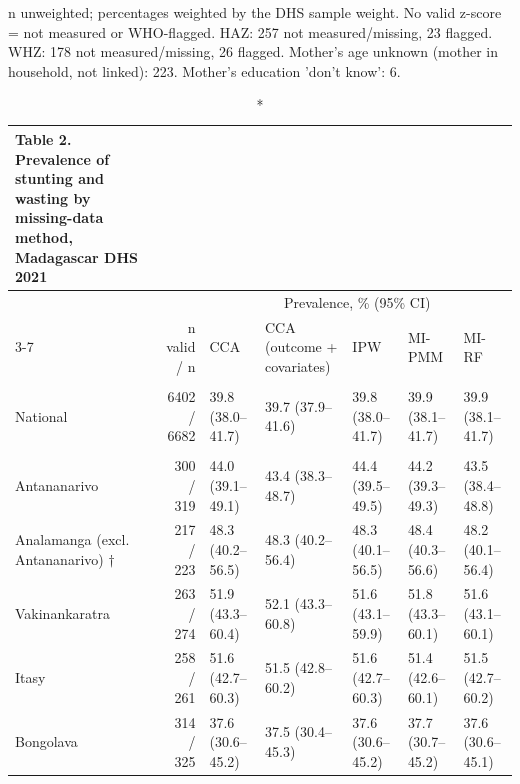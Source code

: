 \documentclass[11pt,a4paper]{article}
\begin{document}
\begin{minipage}{\linewidth}
\vspace{.05em}
n unweighted; percentages weighted by the DHS sample weight. No valid z-score = not measured or WHO-flagged. HAZ: 257 not measured/missing, 23 flagged. WHZ: 178 not measured/missing, 26 flagged. Mother's age unknown (mother in household, not linked): 223. Mother's education 'don't know': 6.\\
\end{minipage}
\endgroup

\clearpage

\begin{landscape}
\begingroup
\fontsize{8.0pt}{10.0pt}\selectfont
\setlength{\LTpost}{0mm}
\begin{longtable}{l|rlllll}
\caption*{
{\fontsize{20}{25}\selectfont  Table 2. Prevalence of stunting and wasting by missing-data method, Madagascar DHS 2021\fontsize{8}{10}\selectfont }
} \\ 
\toprule
 &  & \multicolumn{5}{c}{{Prevalence, \% (95\% CI)}} \\ 
\cmidrule(lr){3-7}
 & n valid / n & CCA & CCA (outcome + covariates) & IPW & MI-PMM & MI-RF \\ 
\midrule\endhead\addlinespace[2.5pt]
\multicolumn{7}{l}{Stunting — National} \\[2.5pt] 
\midrule\addlinespace[2.5pt]
National & 6402 / 6682 & 39.8 (38.0–41.7) & 39.7 (37.9–41.6) & 39.8 (38.0–41.7) & 39.9 (38.1–41.7) & 39.9 (38.1–41.7) \\ 
\midrule\addlinespace[2.5pt]
\multicolumn{7}{l}{Stunting — Region} \\[2.5pt] 
\midrule\addlinespace[2.5pt]
Antananarivo & 300 / 319 & 44.0 (39.1–49.1) & 43.4 (38.3–48.7) & 44.4 (39.5–49.5) & 44.2 (39.3–49.3) & 43.5 (38.4–48.8) \\ 
Analamanga (excl. Antananarivo) $\dagger$ & 217 / 223 & 48.3 (40.2–56.5) & 48.3 (40.2–56.4) & 48.3 (40.1–56.5) & 48.4 (40.3–56.6) & 48.2 (40.1–56.4) \\ 
Vakinankaratra & 263 / 274 & 51.9 (43.3–60.4) & 52.1 (43.3–60.8) & 51.6 (43.1–59.9) & 51.8 (43.3–60.1) & 51.6 (43.1–60.1) \\ 
Itasy & 258 / 261 & 51.6 (42.7–60.3) & 51.5 (42.8–60.2) & 51.6 (42.7–60.3) & 51.4 (42.6–60.1) & 51.5 (42.7–60.2) \\ 
Bongolava & 314 / 325 & 37.6 (30.6–45.2) & 37.5 (30.4–45.3) & 37.6 (30.6–45.2) & 37.7 (30.7–45.2) & 37.6 (30.6–45.1) \\ 

\end{longtable}
\end{landscape}
\end{document}
